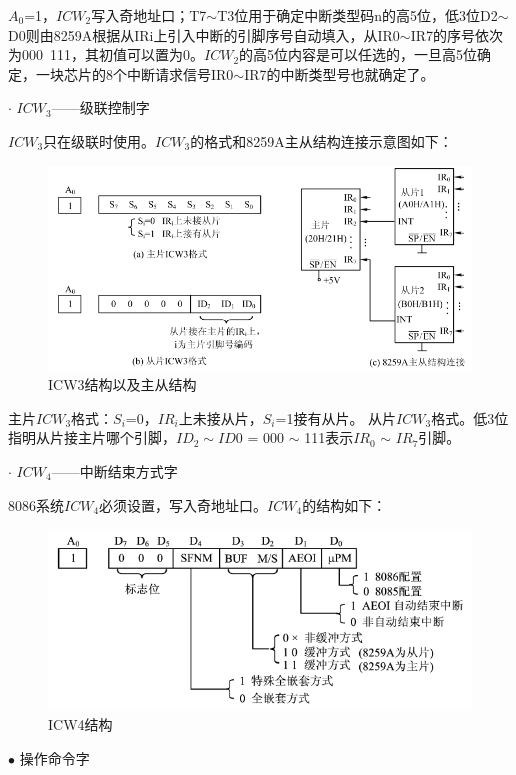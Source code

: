 \documentclass[UTF8,12pt]{ctexart}
\begin{document}
    $A_0$=1，$ICW_2$写入奇地址口；T7$\sim$T3位用于确定中断类型码n的高5位，低3位D2$\sim$D0则由8259A根据从IRi上引入中断的引脚序号自动填入，从IR0$\sim$IR7的序号依次为000~111，其初值可以置为0。$ICW_2$的高5位内容是可以任选的，一旦高5位确定，一块芯片的8个中断请求信号IR0$\sim$IR7的中断类型号也就确定了。
    
    $\cdot$ $ICW_3$——级联控制字
    
    $ICW_3$只在级联时使用。$ICW_3$的格式和8259A主从结构连接示意图如下：
    \begin{figure}[H]
        \centering
        \includegraphics[width=14cm]{images/ICW3.png}
        \caption{ICW3结构以及主从结构}
        \label{ICW3}
    \end{figure}
    
    主片$ICW_3$格式：$S_i$=0，$IR_i$上未接从片，$S_i$=1接有从片。
    从片$ICW_3$格式。低3位指明从片接主片哪个引脚，$ID_2 \sim ID0$ = 000 $\sim$ 111表示$IR_0$ $\sim$ $IR_7$引脚。
    
    $\cdot$ $ICW_4$——中断结束方式字
    
    8086系统$ICW_4$必须设置，写入奇地址口。$ICW_4$的结构如下：
    \begin{figure}[H]
        \centering
        \includegraphics[width=12cm]{images/ICW4.png}
        \caption{ICW4结构}
        \label{ICW4}
    \end{figure}
    
    $\bullet$ 操作命令字
    
\end{document}
